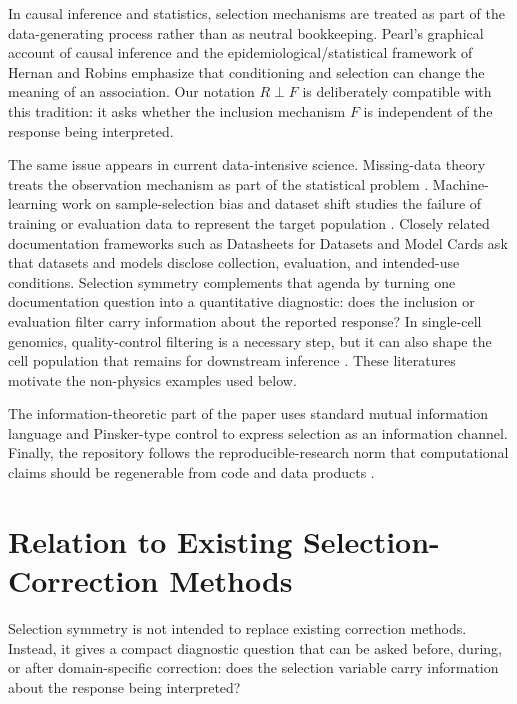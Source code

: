 \documentclass[11pt]{article}
\begin{document}
In causal inference and statistics, selection mechanisms are treated as part of the data-generating process rather than as neutral bookkeeping. Pearl's graphical account of causal inference \cite{Pearl2009} and the epidemiological/statistical framework of Hernan and Robins \cite{HernanRobins2020} emphasize that conditioning and selection can change the meaning of an association. Our notation \(R\perp F\) is deliberately compatible with this tradition: it asks whether the inclusion mechanism \(F\) is independent of the response being interpreted.

The same issue appears in current data-intensive science. Missing-data theory treats the observation mechanism as part of the statistical problem \cite{LittleRubin2019}. Machine-learning work on sample-selection bias and dataset shift studies the failure of training or evaluation data to represent the target population \cite{Zadrozny2004,QuinoneroCandela2009}. Closely related documentation frameworks such as Datasheets for Datasets \cite{Gebru2021} and Model Cards \cite{Mitchell2019} ask that datasets and models disclose collection, evaluation, and intended-use conditions. Selection symmetry complements that agenda by turning one documentation question into a quantitative diagnostic: does the inclusion or evaluation filter carry information about the reported response? In single-cell genomics, quality-control filtering is a necessary step, but it can also shape the cell population that remains for downstream inference \cite{LueckenTheis2019,Amezquita2020}. These literatures motivate the non-physics examples used below.

The information-theoretic part of the paper uses standard mutual information language \cite{CoverThomas2006} and Pinsker-type control \cite{Pinsker1964} to express selection as an information channel. Finally, the repository follows the reproducible-research norm that computational claims should be regenerable from code and data products \cite{Peng2011}.

\section{Relation to Existing Selection-Correction Methods}

Selection symmetry is not intended to replace existing correction methods. Instead, it gives a compact diagnostic question that can be asked before, during, or after domain-specific correction: does the selection variable carry information about the response being interpreted?
\end{document}
